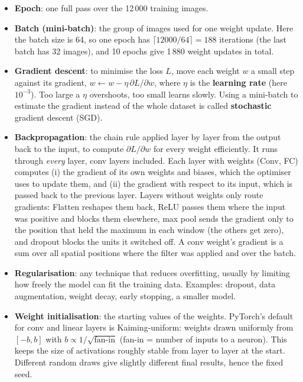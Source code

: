 \documentclass[11pt]{article}
\newcommand{\key}[1]{\textbf{#1}}
\begin{document}
\begin{itemize}[noitemsep]
\item \key{Epoch}: one full pass over the 12\,000 training images.
\item \key{Batch (mini-batch)}: the group of images used for one weight update. Here the batch size is 64, so one epoch has $\lceil 12000/64\rceil = 188$ iterations (the last batch has 32 images), and 10 epochs give 1\,880 weight updates in total.
\item \key{Gradient descent}: to minimise the loss $L$, move each weight $w$ a small step against its gradient, $w \leftarrow w - \eta\,\partial L/\partial w$, where $\eta$ is the \key{learning rate} (here $10^{-3}$). Too large a $\eta$ overshoots, too small learns slowly. Using a mini-batch to estimate the gradient instead of the whole dataset is called \key{stochastic} gradient descent (SGD).
\item \key{Backpropagation}: the chain rule applied layer by layer from the output back to the input, to compute $\partial L/\partial w$ for every weight efficiently. It runs through \emph{every} layer, conv layers included. Each layer with weights (Conv, FC) computes (i) the gradient of its own weights and biases, which the optimiser uses to update them, and (ii) the gradient with respect to its input, which is passed back to the previous layer. Layers without weights only route gradients: Flatten reshapes them back, ReLU passes them where the input was positive and blocks them elsewhere, max pool sends the gradient only to the position that held the maximum in each window (the others get zero), and dropout blocks the units it switched off. A conv weight's gradient is a sum over all spatial positions where the filter was applied and over the batch.
\item \key{Regularisation}: any technique that reduces overfitting, usually by limiting how freely the model can fit the training data. Examples: dropout, data augmentation, weight decay, early stopping, a smaller model.
\item \key{Weight initialisation}: the starting values of the weights. PyTorch's default for conv and linear layers is Kaiming-uniform: weights drawn uniformly from $[-b,b]$ with $b\propto 1/\sqrt{\text{fan-in}}$ (fan-in = number of inputs to a neuron). This keeps the size of activations roughly stable from layer to layer at the start. Different random draws give slightly different final results, hence the fixed seed.
\end{itemize}
\end{document}
